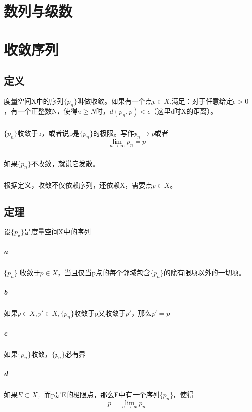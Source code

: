 \chapter{数列与级数}
\chapter*{收敛序列}
\section{定义} 度量空间X中的序列$\{p_n\}$叫做收敛。如果有一个点$p \in X$,满足：对于任意给定$\epsilon > 0$，有一个正整数N，使得$n \ge N$时，$d(p_n, p) < \epsilon$（这里d时X的距离）。
\paragraph{}$\{p_n\}$收敛于p，或者说p是$\{p_n\}$的极限。写作$p_n \to p$或者$$\lim_{n \to \infty}{p_n} = p $$
\paragraph{}如果$\{p_n\}$不收敛，就说它发散。
\paragraph{} 根据定义，收敛不仅依赖序列，还依赖X，需要点$p \in X$。
\section{定理} 设$\{p_n\}$是度量空间X中的序列
\paragraph{a} $\{p_n\}$ 收敛于$p \in X$，当且仅当p点的每个邻域包含$\{p_n\}$的除有限项以外的一切项。
\paragraph{b} 如果$p \in X, p' \in X, \{p_n\}$收敛于p又收敛于$p'$，那么$p' = p$
\paragraph{c} 如果$\{p_n\}$收敛，$\{p_n\}$必有界
\paragraph{d} 如果$E \subset X$，而p是E的极限点，那么E中有一个序列$\{p_n\}$，使得$$p = \lim_{n\rightarrow \infty}{p_n}$$
